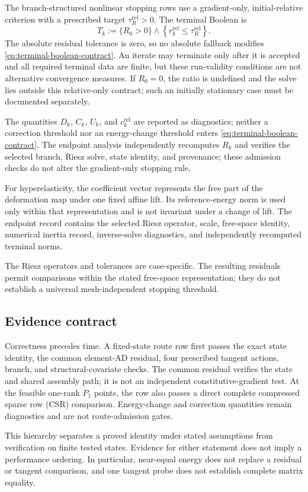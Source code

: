 The branch-structured nonlinear stopping rows use a gradient-only,
initial-relative criterion with a prescribed target
$\tau_R^{\mathrm{rel}}>0$. The terminal Boolean is
\begin{equation}
  T_k
  :=\{R_0>0\}\land
    \left\{r_k^{\mathrm{rel}}
      \leq\tau_R^{\mathrm{rel}}\right\}.
  \label{eq:terminal-boolean-contract}
\end{equation}
The absolute residual tolerance is zero, so no absolute fallback modifies
\eqref{eq:terminal-boolean-contract}. An iterate may terminate
only after it is accepted and all required terminal data are finite, but these
run-validity conditions are not alternative convergence measures. If $R_0=0$,
the ratio is undefined and the solve lies outside this relative-only contract;
such an initially stationary case must be documented separately.

The quantities $D_k$, $C_k$, $U_k$, and $c_k^{\mathrm{rel}}$ are reported as
diagnostics; neither a correction threshold nor an energy-change threshold
enters \eqref{eq:terminal-boolean-contract}. The endpoint analysis independently
recomputes $R_k$ and verifies the selected branch, Riesz solve, state identity,
and provenance; these admission checks do not alter the gradient-only stopping
rule.

For hyperelasticity, the coefficient vector represents the free part of the
deformation map under one fixed affine lift. Its reference-energy norm is used
only within that representation and is not invariant under a change of lift.
The endpoint record contains the selected Riesz operator, scale, free-space
identity, numerical inertia record, inverse-solve diagnostics, and independently
recomputed terminal norms.

The Riesz operators and tolerances are case-specific. The resulting residuals
permit comparisons within the stated free-space representation; they do not
establish a universal mesh-independent stopping threshold.

\subsection{Evidence contract}
\label{subsec:evidence-contract}

Correctness precedes time. A fixed-state route row first passes the exact state
identity, the common element-AD residual, four prescribed tangent actions,
branch, and structural-covariate checks. The common residual verifies the state
and shared assembly path; it is not an independent constitutive-gradient test.
At the feasible one-rank $P_1$ points, the row also passes a direct complete
compressed sparse row (CSR) comparison. Energy-change and correction quantities
remain diagnostics and are not route-admission gates.

This hierarchy separates a proved identity under stated assumptions from
verification on finite tested states. Evidence for either statement does not
imply a performance ordering. In particular, near-equal energy does not replace
a residual or tangent comparison, and one tangent probe does not establish
complete matrix equality.
